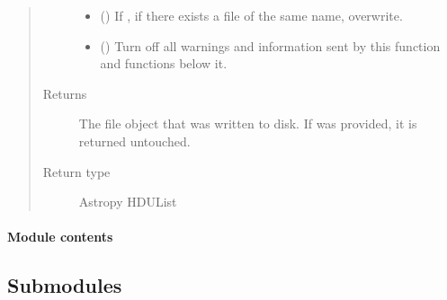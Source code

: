 \documentclass[letterpaper,10pt,english]{sphinxmanual}
\begin{document}
\begin{fulllineitems}
\begin{fulllineitems}
\begin{quote}
\begin{description}
\begin{itemize}
\item {} 
 (\sphinxstyleliteralemphasis{\sphinxupquote{ (}}\sphinxstyleliteralemphasis{\sphinxupquote{)}}) \textendash{} If , if there exists a file of the same name, overwrite.

\item {} 
 (\sphinxstyleliteralemphasis{\sphinxupquote{ (}}\sphinxstyleliteralemphasis{\sphinxupquote{)}}) \textendash{} Turn off all warnings and information sent by this function and
functions below it.

\end{itemize}

\item[{Returns}] \leavevmode
{} \textendash{} The file object that was written to disk. If  was
provided, it is returned untouched.

\item[{Return type}] \leavevmode
Astropy HDUList

\end{description}\end{quote}

\end{fulllineitems}


\end{fulllineitems}



\paragraph{Module contents}
\label{\detokenize{python_docstrings/IfA_Smeargle.zulu:module-IfA_Smeargle.zulu}}\label{\detokenize{python_docstrings/IfA_Smeargle.zulu:module-contents}}

\subsection{Submodules}
\label{\detokenize{python_docstrings/IfA_Smeargle:submodules}}
\end{document}
